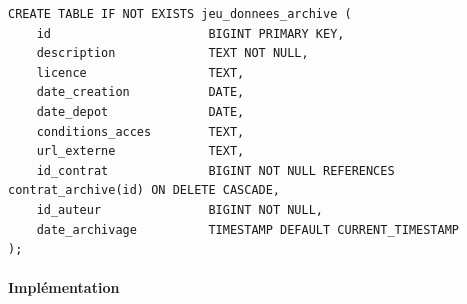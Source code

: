 \documentclass[12pt,a4paper]{article}
\begin{document}
\begin{lstlisting}[style=sqlstyle, caption=Table jeu\_donnee\_archive]
CREATE TABLE IF NOT EXISTS jeu_donnees_archive (
    id                      BIGINT PRIMARY KEY,
    description             TEXT NOT NULL,
    licence                 TEXT,
    date_creation           DATE,
    date_depot              DATE,
    conditions_acces        TEXT,
    url_externe             TEXT,
    id_contrat              BIGINT NOT NULL REFERENCES contrat_archive(id) ON DELETE CASCADE,
    id_auteur               BIGINT NOT NULL,
    date_archivage          TIMESTAMP DEFAULT CURRENT_TIMESTAMP
);
\end{lstlisting}

\paragraph{Implémentation}
\end{document}
